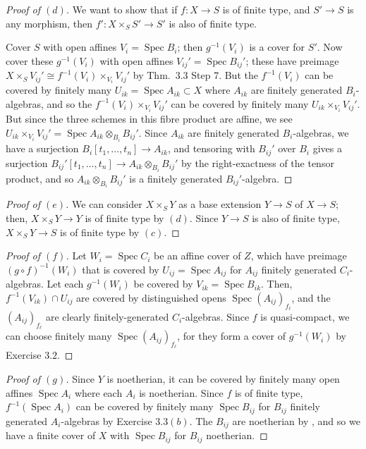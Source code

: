 \documentclass[10pt]{article}
\theoremstyle{definition}
\theoremstyle{remark}
\numberwithin{equation}{section}
\numberwithin{figure}{subsubsection}
\DeclareMathOperator{\Spec}{Spec}
\begin{document}
\begin{proof}[Proof of $(d)$]
  We want to show that if $f\colon X \to S$ is of finite type, and $S' \to S$ is any morphism, then $f'\colon X \times_S S' \to S'$ is also of finite type.
  \par Cover $S$ with open affines $V_i = \Spec B_i$; then $g^{-1}(V_i)$ is a cover for $S'$. Now cover these $g^{-1}(V_i)$ with open affines $V_{ij}' = \Spec B_{ij}'$; these have preimage $X \times_S V_{ij}' \cong f^{-1}(V_i) \times_{V_i} V_{ij}'$ by Thm.~3.3 Step 7. But the $f^{-1}(V_i)$ can be covered by finitely many $U_{ik} = \Spec A_{ik} \subset X$ where $A_{ik}$ are finitely generated $B_i$-algebras, and so the $f^{-1}(V_i) \times_{V_i} V_{ij}'$ can be covered by finitely many $U_{ik} \times_{V_i} V_{ij}'$. But since the three schemes in this fibre product are affine, we see $U_{ik} \times_{V_i} V_{ij}' = \Spec A_{ik} \otimes_{B_i} B_{ij}'$. Since $A_{ik}$ are finitely generated $B_i$-algebras, we have a surjection $B_i[t_1,\ldots,t_n] \to A_{ik}$, and tensoring with $B_{ij}'$ over $B_i$ gives a surjection $B_{ij}'[t_1,\ldots,t_n] \to A_{ik} \otimes_{B_i} B_{ij}'$ by the right-exactness of the tensor product, and so $A_{ik} \otimes_{B_i} B_{ij}'$ is a finitely generated $B_{ij}'$-algebra.
\end{proof}
\begin{proof}[Proof of $(e)$]
  We can consider $X \times_S Y$ as a base extension $Y \to S$ of $X \to S$; then, $X \times_S Y \to Y$ is of finite type by $(d)$. Since $Y \to S$ is also of finite type, $X \times_S Y \to S$ is of finite type by $(c)$.
\end{proof}
\begin{proof}[Proof of $(f)$]
  Let $W_i = \Spec C_i$ be an affine cover of $Z$, which have preimage $(g \circ f)^{-1}(W_i)$ that is covered by $U_{ij} = \Spec A_{ij}$ for $A_{ij}$ finitely generated $C_i$-algebras. Let each $g^{-1}(W_i)$ be covered by $V_{ik} = \Spec B_{ik}$. Then, $f^{-1}(V_{ik}) \cap U_{ij}$ are covered by distinguished opens $\Spec (A_{ij})_{f_\ell}$, and the $(A_{ij})_{f_\ell}$ are clearly finitely-generated $C_i$-algebras. Since $f$ is quasi-compact, we can choose finitely many $\Spec(A_{ij})_{f_\ell}$, for they form a cover of $g^{-1}(W_i)$ by Exercise $3.2$.
\end{proof}
\begin{proof}[Proof of $(g)$]
  Since $Y$ is noetherian, it can be covered by finitely many open affines $\Spec A_i$ where each $A_i$ is noetherian. Since $f$ is of finite type, $f^{-1}(\Spec A_i)$ can be covered by finitely many $\Spec B_{ij}$ for $B_{ij}$ finitely generated $A_i$-algebras by Exercise $3.3(b)$. The $B_{ij}$ are noetherian by \cite[Cor.~7.7]{AM69}, and so we have a finite cover of $X$ with $\Spec B_{ij}$ for $B_{ij}$ noetherian.
\end{proof}
\end{document}
